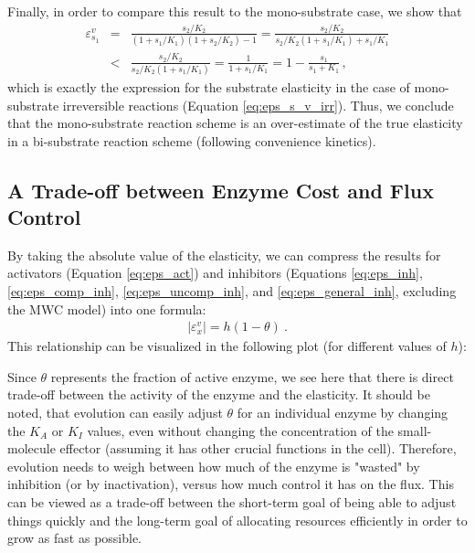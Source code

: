 \documentclass[12pt,a4paper]{article}
\begin{document}
Finally, in order to compare this result to the mono-substrate case, we show that
\begin{eqnarray}
\varepsilon^{v}_{s_1} &=& \frac{s_2/K_2}{(1 + s_1/K_1) (1 + s_2 / K_2) - 1} = 
\frac{s_2/K_2}{s_2 / K_2 (1 + s_1/K_1)  + s_1/K_1} \nonumber\\
&<& \frac{s_2/K_2}{s_2 / K_2 (1 + s_1/K_1)} = \frac{1}{1 + s_1/K_1} = 1 - \frac{s_1}{s_1 + K_1}\,,
\end{eqnarray}
which is exactly the expression for the substrate elasticity in the case of mono-substrate irreversible reactions (Equation \ref{eq:eps_s_v_irr}). Thus, we conclude that the mono-substrate reaction scheme is an over-estimate of the true elasticity in a bi-substrate reaction scheme (following convenience kinetics).

\subsection{A Trade-off between Enzyme Cost and Flux Control}
By taking the absolute value of the elasticity, we can compress the results for activators (Equation \ref{eq:eps_act}) and inhibitors (Equations \ref{eq:eps_inh}, \ref{eq:eps_comp_inh}, \ref{eq:eps_uncomp_inh}, and \ref{eq:eps_general_inh}, excluding the MWC model) into one formula:
\begin{eqnarray}
|\varepsilon_x^v| = h (1 - \theta)~. \label{eq:abs_elast}
\end{eqnarray}
This relationship can be visualized in the following plot (for different values of $h$):
\begin{center}
\end{center}

Since $\theta$ represents the fraction of active enzyme, we see here that there is direct trade-off between the activity of the enzyme and the elasticity. It should be noted, that evolution can easily adjust $\theta$ for an individual enzyme by changing the $K_A$ or $K_I$ values, even without changing the concentration of the small-molecule effector (assuming it has other crucial functions in the cell). Therefore, evolution needs to weigh between how much of the enzyme is "wasted" by inhibition (or by inactivation), versus how much control it has on the flux. This can be viewed as a trade-off between the short-term goal of being able to adjust things quickly and the long-term goal of allocating resources efficiently in order to grow as fast as possible.
\end{document}
